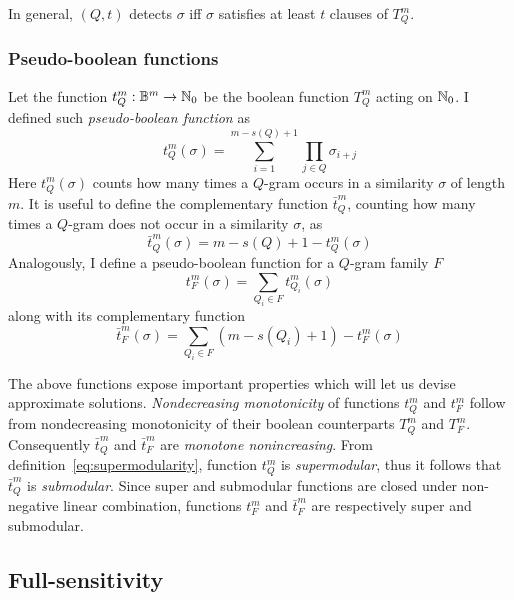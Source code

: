 In general, $(Q,t)$ detects $\sigma$ iff $\sigma$ satisfies at least $t$ clauses of $T_{Q}^{m}$.

\subsubsection{Pseudo-boolean functions}

Let the function $t_{Q}^{m}: \mathbb {B}^m \rightarrow \mathbb {N}_0$ be the boolean function $T_{Q}^{m}$ acting on $\mathbb {N}_0$.
I defined such \emph{pseudo-boolean function} as
\begin{equation}
\label{eq:qgram-pseudo}
t_{Q}^{m}(\sigma) = \sum_{i=1}^{m-s(Q)+1} \prod_{j \in Q}\sigma_{i+j}
\end{equation}
Here $t_{Q}^{m}(\sigma)$ counts how many times a $Q$-gram occurs in a similarity $\sigma$ of length $m$.
It is useful to define the complementary function $\bar{t}_{Q}^{m}$, counting how many times a $Q$-gram does not occur in a similarity $\sigma$, as
\begin{equation}
\label{eq:qgram-pseudoneg}
\bar{t}_{Q}^{m}(\sigma) = m - s(Q) + 1 - t_{Q}^{m}(\sigma)
\end{equation}
Analogously, I define a pseudo-boolean function for a $Q$-gram family $F$
\begin{equation}
\label{eq:family-pseudo}
t_{F}^{m}(\sigma) = \sum_{Q_i \in F} t_{Q_i}^{m}(\sigma)
\end{equation}
along with its complementary function
\begin{equation}
\label{eq:family-pseudoneg}
\bar{t}_{F}^{m}(\sigma) = \sum_{Q_i \in F}{(m - s(Q_i) + 1)} - t_{F}^{m}(\sigma)
\end{equation}

The above functions expose important properties which will let us devise approximate solutions.
\emph{Nondecreasing monotonicity} of functions $t_{Q}^{m}$ and $t_{F}^{m}$ follow from nondecreasing monotonicity of their boolean counterparts $T_{Q}^{m}$ and $T_{F}^{m}$. Consequently $\bar{t}_{Q}^{m}$ and $\bar{t}_{F}^{m}$ are \emph{monotone nonincreasing}.
From definition~\ref{eq:supermodularity}, function $t_{Q}^{m}$ is \emph{supermodular}, thus it follows that $\bar{t}_{Q}^{m}$ is \emph{submodular}.
Since super and submodular functions are closed under non-negative linear combination, functions $t_{F}^{m}$ and $\bar{t}_{F}^{m}$ are respectively super and submodular.

\subsection{Full-sensitivity}

